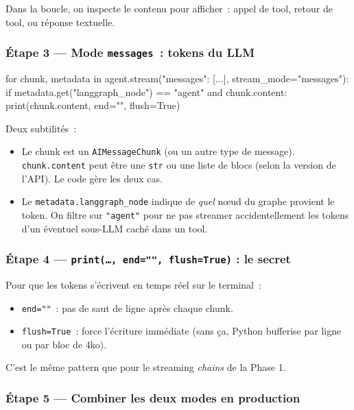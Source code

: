 \documentclass[11pt,a4paper]{article}
\begin{document}
Dans la boucle, on inspecte le contenu pour afficher~: appel de tool,
retour de tool, ou réponse textuelle.

\subsubsection*{Étape 3 — Mode \texttt{messages}~: tokens du LLM}

\begin{pythoncode}
for chunk, metadata in agent.stream({"messages": [...]}, stream_mode="messages"):
    if metadata.get("langgraph_node") == "agent" and chunk.content:
        print(chunk.content, end="", flush=True)
\end{pythoncode}

Deux subtilités~:

\begin{itemize}[leftmargin=*]
  \item Le chunk est un \texttt{AIMessageChunk} (ou un autre type de
        message). \texttt{chunk.content} peut être une \texttt{str} ou
        une liste de blocs (selon la version de l'API). Le code gère
        les deux cas.
  \item Le \texttt{metadata.langgraph\_node} indique de \emph{quel}
        nœud du graphe provient le token. On filtre sur
        \texttt{"agent"} pour ne pas streamer accidentellement les
        tokens d'un éventuel sous-LLM caché dans un tool.
\end{itemize}

\subsubsection*{Étape 4 — \texttt{print(\dots, end="", flush=True)} : le secret}

Pour que les tokens s'écrivent en temps réel sur le terminal~:
\begin{itemize}[leftmargin=*]
  \item \texttt{end=""}~: pas de saut de ligne après chaque chunk.
  \item \texttt{flush=True}~: force l'écriture immédiate (sans ça,
        Python bufferise par ligne ou par bloc de 4ko).
\end{itemize}

C'est le même pattern que pour le streaming \emph{chains} de la Phase 1.

\subsubsection*{Étape 5 — Combiner les deux modes en production}
\end{document}
